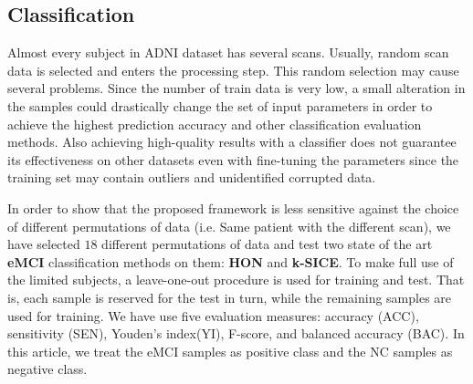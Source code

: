 \documentclass[journal]{IEEEtran}
\begin{document}
	
	
	\subsection{Classification}
	
	Almost every subject in ADNI dataset has several scans. Usually, random scan data is selected and enters the processing step\cite{r14}. This random selection may cause several problems. Since the number of train data is very low, a small alteration in the samples could drastically change the set of input parameters in order to achieve the highest prediction accuracy and other classification evaluation methods. Also achieving high-quality results with a classifier does not guarantee its effectiveness on other datasets even with fine-tuning the parameters since the training set may contain outliers and unidentified corrupted data.
	
	In order to show that the proposed framework is less sensitive against the choice of different permutations of data (i.e. Same patient with the different scan), we have selected $18$ different permutations of data and test two state of the art \textbf{eMCI} classification methods on them: \textbf{HON}\cite{r14a} and \textbf{k-SICE}\cite{r14}.   
	To make full use of the limited subjects, a leave-one-out procedure is used for training and test. That is, each sample is reserved for the test in turn, while the remaining samples are used for training.
	We have use five
	evaluation measures: accuracy (ACC), sensitivity (SEN), Youden’s index(YI), F-score, and balanced accuracy (BAC)\cite{r65}.
	In this article, we treat the eMCI samples as positive class and the NC samples as negative class.
	
\end{document}
